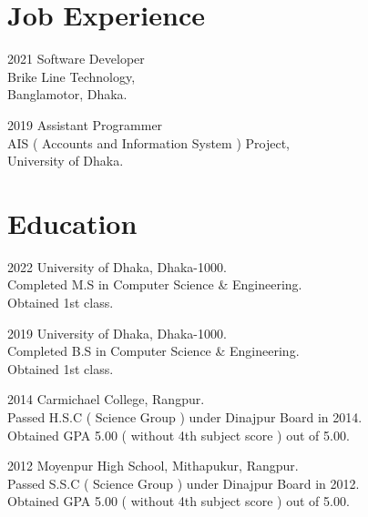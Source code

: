\documentclass[a4paper,12pt]{article}
\begin{document}
\section{Job Experience}

\begin{CV}

  \item[2021] Software Developer\\
  Brike Line Technology,\\
  Banglamotor, Dhaka.\\
  \item[2019] Assistant Programmer\\
  AIS ( Accounts and Information System ) Project,\\
  University of Dhaka.
  \end{CV}
  \section{Education}
  \begin{CV}
    \item[2022] University of Dhaka, Dhaka-1000.\\
    Completed M.S in Computer Science \& Engineering.\\
    Obtained 1st class.\\
    \item[2019] University of Dhaka, Dhaka-1000.\\
    Completed B.S in Computer Science \& Engineering.\\
    Obtained 1st class.\\
    \item[2014] Carmichael College, Rangpur.\\
    Passed H.S.C ( Science Group ) under Dinajpur Board in 2014.\\
    Obtained GPA 5.00 ( without 4th subject score ) out of 5.00.
    \item[2012] Moyenpur High School, Mithapukur, Rangpur.\\
    Passed S.S.C ( Science Group ) under Dinajpur Board in 2012.\\
    Obtained GPA 5.00 ( without 4th subject score ) out of 5.00.\\
    
  \end{CV}
\end{document}
